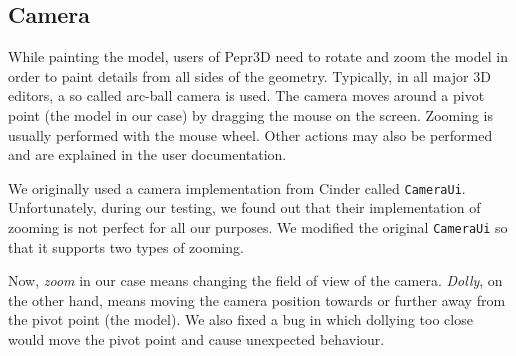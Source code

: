 \subsection{Camera}

While painting the model, users of Pepr3D need to rotate and zoom the model in order to paint details from all sides of the geometry.
Typically, in all major 3D editors, a so called arc-ball camera is used.
The camera moves around a pivot point (the model in our case) by dragging the mouse on the screen.
Zooming is usually performed with the mouse wheel.
Other actions may also be performed and are explained in the user documentation.

We originally used a camera implementation from Cinder called \texttt{CameraUi}.
Unfortunately, during our testing, we found out that their implementation of zooming is not perfect for all our purposes.
We modified the original \texttt{CameraUi} so that it supports two types of zooming.

Now, \emph{zoom} in our case means changing the field of view of the camera.
\emph{Dolly}, on the other hand, means moving the camera position towards or further away from the pivot point (the model).
We also fixed a bug in which dollying too close would move the pivot point and cause unexpected behaviour.
